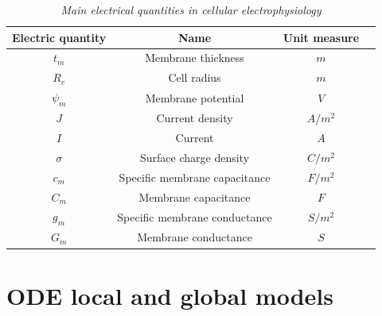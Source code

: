 \documentclass[12pt, a4paper]{report}
\begin{document}
\begin{table}[H]
	\begin{center}
		\begin{tabular}{ |c|c|c|c| } 
			\hline
			\textbf{Electric quantity} & \textbf{Name} & \textbf{Unit measure} \\
			\hline
			$t_m$ & Membrane thickness & $m$ \\ 
			\hline
			$R_c$ & Cell radius & $m$ \\
			\hline
			$\psi_m$ & Membrane potential & $V$ \\
			\hline
			$J$ & Current density & $A/m^2$ \\
			\hline
			$I$ & Current & $A$ \\
			\hline
			$\sigma$ & Surface charge density & $C/m^2$ \\
			\hline
			$c_m$ & Specific membrane capacitance & $F/m^2$ \\
			\hline
			$C_m$ & Membrane capacitance & $F$ \\
			\hline
			$g_m$ & Specific membrane conductance & $S/m^2$ \\
			\hline
			$G_m$ & Membrane conductance & $S$ \\
			
			\hline
		\end{tabular}
		
	\end{center}
	\caption{\textit{Main electrical quantities in cellular electrophysiology}}
\end{table}


\section{ODE local and global models}
\end{document}
